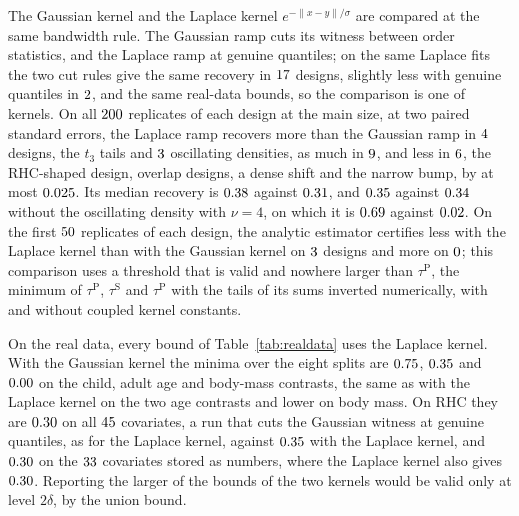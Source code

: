 The Gaussian kernel and the Laplace kernel $e^{-\|x-y\|/\sigma}$ are compared at the same bandwidth rule. The
Gaussian ramp cuts its witness between order statistics, and the Laplace ramp at genuine quantiles; on the same Laplace
fits the two cut rules give the same recovery in $17$ designs, slightly less with genuine quantiles in
$2$, and the same real-data bounds, so the comparison is one of kernels. On all $200$
replicates of each design at the main size, at two paired standard errors, the Laplace ramp recovers more than the
Gaussian ramp in $4$ designs, the $t_3$ tails and $3$ oscillating densities, as much in
$9$, and less in $6$, the RHC-shaped design, overlap designs, a dense shift and the narrow
bump, by at most $0.025$. Its median recovery is $0.38$ against $0.31$, and
$0.35$ against $0.34$ without the oscillating density with $\nu=4$, on which it
is $0.69$ against $0.02$. On the first $50$ replicates of each design, the analytic
estimator certifies less with the Laplace kernel than with the Gaussian kernel on $3$ designs and more
on $0$; this comparison uses a threshold that is valid and nowhere larger than $\tau^{\mathrm P}$, the
minimum of $\tau^{\mathrm P}$, $\tau^{\mathrm S}$ and $\tau^{\mathrm P}$ with the tails of its sums inverted
numerically, with and without coupled kernel constants.

On the real data, every bound of Table~\ref{tab:realdata} uses the Laplace kernel. With the Gaussian kernel the
minima over the eight splits are $0.75$, $0.35$ and $0.00$ on the child, adult age
and body-mass contrasts, the same as with the Laplace kernel on the two age contrasts and lower on body mass. On RHC
they are $0.30$ on all $45$ covariates, a run that cuts the Gaussian witness at genuine
quantiles, as for the Laplace kernel, against $0.35$ with the Laplace kernel,
and $0.30$ on the $33$ covariates stored as numbers, where the Laplace kernel also gives
$0.30$. Reporting the larger of the bounds of the two kernels would be valid only at level $2\delta$, by the
union bound.

